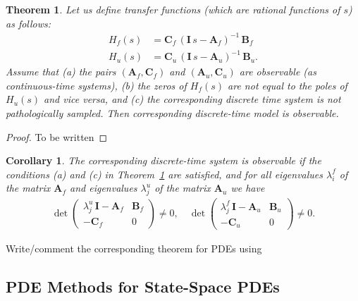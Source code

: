 \documentclass[journal]{IEEEtran}
\newtheorem{theorem}{Theorem}[section]
\newtheorem{corollary}{Corollary}[section]
\newcommand{\simo}[1]{{\color{red}#1}}
\begin{document}
\begin{theorem} \label{the:obsv}
  Let us define transfer functions (which are rational functions of $s$) as follows:
\begin{equation}
\begin{split}
  H_f(s) &= \mathbf{C}_f \, (\mathbf{I} \, s - \mathbf{A}_f)^{-1} \, \mathbf{B}_f \\
  H_u(s) &= \mathbf{C}_u \, (\mathbf{I} \, s - \mathbf{A}_u)^{-1} \, \mathbf{B}_u.
\end{split}
\end{equation}
%
Assume that (a) the pairs $(\mathbf{A}_f,\mathbf{C}_f)$ and $(\mathbf{A}_u,\mathbf{C}_u)$ are observable (as continuous-time systems), (b) the zeros of $H_f(s)$ are not equal to the poles of $H_u(s)$ and vice versa, and (c) the corresponding discrete time system is not pathologically sampled. Then corresponding discrete-time model is observable.
\end{theorem}

\begin{proof}
  \simo{To be written}
\end{proof}

\begin{corollary}
The corresponding discrete-time system is observable if the conditions (a) and (c) in Theorem~\ref{the:obsv} are satisfied, and for all eigenvalues $\lambda^f_i$ of the matrix $\mathbf{A}_f$ and eigenvalues $\lambda^u_j$ of the matrix $\mathbf{A}_u$ we have
%
\begin{equation}
\begin{split}
  \det \begin{pmatrix}
    \lambda^u_j \, \mathbf{I}-\mathbf{A}_f & \mathbf{B}_f \\ -\mathbf{C}_f & 0
    \end{pmatrix} \neq 0,
    \quad
  \det \begin{pmatrix}
    \lambda^f_j \, \mathbf{I}-\mathbf{A}_u & \mathbf{B}_u \\ -\mathbf{C}_u & 0
    \end{pmatrix} \neq 0.
\end{split}
\end{equation}
\end{corollary}

\simo{Write/comment the corresponding theorem for PDEs using \cite{Curtain:2012}}

\subsection{PDE Methods for State-Space PDEs}
\end{document}
